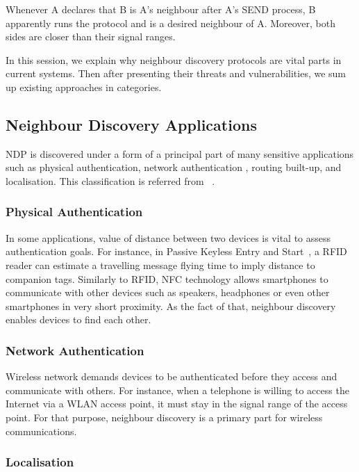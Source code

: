 \begin{Definition}
Whenever A declares that B is A’s neighbour after A’s SEND process, B apparently runs the protocol and is a desired neighbour of A. Moreover, both sides are closer than their signal ranges.
\end{Definition}

In this session, we explain why neighbour discovery protocols are vital parts in current systems. Then after presenting their threats and vulnerabilities, we sum up existing approaches in categories.

\subsection{Neighbour Discovery Applications}

NDP is discovered under a form of a principal part of many sensitive applications such as physical authentication, network authentication , routing built-up, and localisation. This classification is referred from ~\cite{Marcinthesis}.

\subsubsection*{Physical Authentication}

In some applications, value of distance between two devices is vital to assess authentication goals. For instance, in Passive Keyless Entry and Start~\cite{waraksa1990passive}, a RFID reader can estimate a travelling message flying time to imply distance to companion tags. Similarly to RFID, NFC technology allows smartphones to communicate with other devices such as speakers, headphones or even other smartphones in very short proximity. As the fact of that, neighbour discovery enables devices to find each other. 

\subsubsection*{Network Authentication}
Wireless network demands devices to be authenticated before they access and communicate with others. For instance, when a telephone is willing to access the Internet via a WLAN access point, it must stay in the signal range of the access point. For that purpose, neighbour discovery is a primary part for wireless communications. 

\subsubsection*{Localisation}

